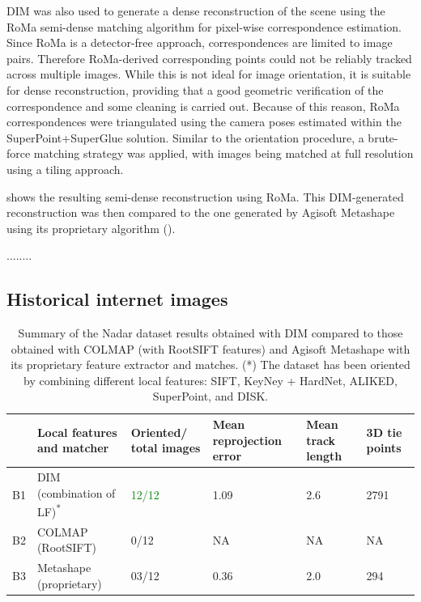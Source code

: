 DIM was also used to generate a dense reconstruction of the scene using the RoMa semi-dense matching algorithm for pixel-wise correspondence estimation. 
Since RoMa is a detector-free approach, correspondences are limited to image pairs. 
Therefore RoMa-derived corresponding points could not be reliably tracked across multiple images. 
While this is not ideal for image orientation, it is suitable for dense reconstruction, providing that a good geometric verification of the correspondence and some cleaning is carried out.
Because of this reason, RoMa correspondences were triangulated using the camera poses estimated within the SuperPoint+SuperGlue solution.
Similar to the orientation procedure, a brute-force matching strategy was applied, with images being matched at full resolution using a tiling approach.

 shows the resulting semi-dense reconstruction using RoMa. 
This DIM-generated reconstruction was then compared to the one generated by Agisoft Metashape using its proprietary algorithm ().

........


\subsection{Historical internet images}

\begin{table}[ht]
    \centering
    \caption{Summary of the Nadar dataset results obtained with DIM compared to those obtained with COLMAP (with RootSIFT features) and Agisoft Metashape with its proprietary feature extractor and matches. (*) The dataset has been oriented by combining different local features: SIFT, KeyNey + HardNet, ALIKED, SuperPoint, and DISK.} 
    \label{tab:5:statistics_summary}
    
    \begin{tabular}{l p{3.5cm} p{2.2cm} p{2.2cm} p{2.2cm} p{2.2cm}}
    \toprule
    &Local features \newline and matcher & Oriented/ \newline total images & Mean reprojection error \newline [px] & Mean track \newline length &  3D tie points\\
    \midrule
    B1 &DIM \newline (combination of LF)\textsuperscript{*}    & \textcolor{green}{12/12}     & 1.09  & 2.6   & 2791 \\
    B2 &COLMAP \newline(RootSIFT)                     & 0/12      & NA    & NA    & NA   \\
    B3 &Metashape \newline (proprietary)              & 03/12     & 0.36  & 2.0   & 294  \\
    \bottomrule
    \end{tabular}
\end{table}

